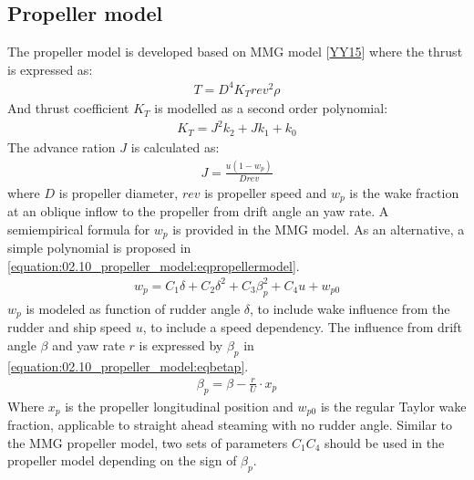\documentclass[review]{elsarticle}
\begin{document}
\subsection{Propeller model}
\label{\detokenize{02.10_propeller_model:propeller-model}}\label{\detokenize{02.10_propeller_model::doc}}
\sphinxAtStartPar
The propeller model is developed based on MMG model {[}\hyperlink{cite.bibligraphy:id22}{YY15}{]} where the thrust is expressed as:
\begin{equation}\label{equation:02.10_propeller_model:eqT}
\begin{split}\displaystyle T = D^{4} K_{T} rev^{2} \rho\end{split}
\end{equation}
\sphinxAtStartPar
And thrust coefficient \(K_T\) is modelled as a second order polynomial:
\begin{equation}\label{equation:02.10_propeller_model:eqkt}
\begin{split}\displaystyle K_{T} = J^{2} k_{2} + J k_{1} + k_{0}\end{split}
\end{equation}
\sphinxAtStartPar
The advance ration \(J\) is calculated as:
\begin{equation}\label{equation:02.10_propeller_model:eqJ}
\begin{split}\displaystyle J = \frac{u \left(1 - w_{p}\right)}{D rev}\end{split}
\end{equation}
\sphinxAtStartPar
where \(D\) is propeller diameter, \(rev\) is propeller speed and \(w_p\) is the wake fraction at an oblique inflow to the propeller from drift angle an yaw rate. A semi\sphinxhyphen{}empirical formula for \(w_p\) is provided in the MMG model. As an alternative, a simple polynomial is proposed in \autoref{equation:02.10_propeller_model:eqpropellermodel}.
\begin{equation}\label{equation:02.10_propeller_model:eqpropellermodel}
\begin{split}\displaystyle w_{p} = C_{1} \delta + C_{2} \delta^{2} + C_{3} \beta_{p}^{2} + C_{4} u + w_{p0}\end{split}
\end{equation}
\sphinxAtStartPar
\(w_p\) is modeled as function of rudder angle \(\delta\), to include wake influence from the rudder and ship speed \(u\), to include a speed dependency. The influence from drift angle \(\beta\) and yaw rate \(r\) is expressed by \(\beta_p\) in \autoref{equation:02.10_propeller_model:eqbetap}.
\begin{equation}\label{equation:02.10_propeller_model:eqbetap}
\begin{split}\beta_p=\beta - \frac{r}{U} \cdot x_p \end{split}
\end{equation}
\sphinxAtStartPar
Where \(x_p\) is the propeller longitudinal position and \(w_{p0}\) is the regular Taylor wake fraction, applicable to straight ahead steaming with no rudder angle. Similar to the MMG propeller model, two sets of parameters \(C_1\)\sphinxhyphen{}\(C_4\) should be used in the propeller model depending on the sign of \(\beta_p\).
\end{document}
